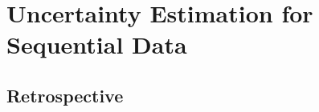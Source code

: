 \chapter{Uncertainty Estimation for Sequential Data}
\label{chap:sequential_data}

\section*{Retrospective}
%